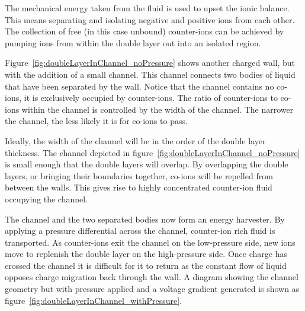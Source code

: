     The mechanical energy taken from the fluid is used to upset the ionic balance.
    This means separating and isolating negative and positive ions from each other.
    The collection of free (in this case unbound) counter-ions can be achieved by pumping ions from within the double layer out into an isolated region.

    Figure~\ref{fig:doubleLayerInChannel_noPressure} shows another charged wall, but with the addition of a small channel.
    This channel connects two bodies of liquid that have been separated by the wall.
    Notice that the channel contains no co-ions, it is exclusively occupied by counter-ions.
    The ratio of counter-ions to co-ions within the channel is controlled by the width of the channel.
    The narrower the channel, the less likely it is for co-ions to pass.

    Ideally, the width of the channel will be in the order of the double layer thickness.
    The channel depicted in figure~\ref{fig:doubleLayerInChannel_noPressure} is small enough that the double layers will overlap.
    By overlapping the double layers, or bringing their boundaries together, co-ions will be repelled from between the walls.
    This gives rise to highly concentrated counter-ion fluid occupying the channel.

    The channel and the two separated bodies now form an energy harvester.
    By applying a pressure differential across the channel, counter-ion rich fluid is transported.
    As counter-ions exit the channel on the low-pressure side, new ions move to replenish the double layer on the high-pressure side.
    Once charge has crossed the channel it is difficult for it to return as the constant flow of liquid opposes charge migration back through the wall.
    A diagram showing the channel geometry but with pressure applied and a voltage gradient generated is shown as figure~\ref{fig:doubleLayerInChannel_withPressure}.

